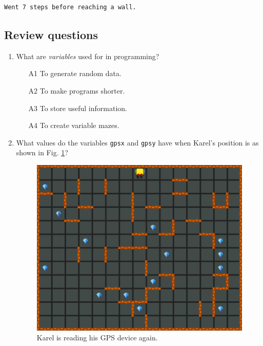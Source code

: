 {{{{\begin{verbatim}
Went 7 steps before reaching a wall.
\end{verbatim}

\subsection{Review questions}

\begin{enumerate}
\item What are {\em variables} used for in programming? 
\begin{enumerate}
\item[A1] To generate random data.
\item[A2] To make programs shorter.
\item[A3] To store useful information.
\item[A4] To create variable mazes.
\end{enumerate}
\item What values do the variables {\tt gpsx} and {\tt gpsy} have when Karel's
position is as shown in Fig. \ref{fig:var2}?
\newpage
\begin{figure}[!ht]
\begin{center}
\includegraphics[height=0.4\textwidth]{imgk/variables2.png}
\end{center}
\vspace{-4mm}
\caption{Karel is reading his GPS device again.}
\label{fig:var2}
\end{figure}
\noindent


\end{enumerate}}}}}
